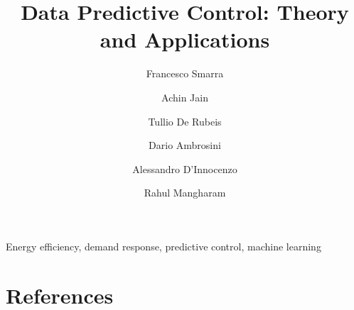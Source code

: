 \documentclass[review]{elsarticle}
\begin{document}
\begin{frontmatter}

\title{Data Predictive Control: Theory and Applications}

\author[FSaddress,EC]{Francesco Smarra}

\author[AJaddress,EC]{Achin Jain}
\author[TDRaddress,EC]{Tullio De Rubeis}
\author[TDRaddress]{Dario Ambrosini}
\author[FSaddress]{Alessandro D'Innocenzo}
\author[AJaddress]{Rahul Mangharam}


\address[FSaddress]{Department of Information Engineering, Computer Science and Mathematics, Università degli Studi dell’Aquila, L’Aquila, Italy}
\address[AJaddress]{Department of Electrical and Systems Engineering, University of Pennsylvania, Philadelphia, USA}
\address[TDRaddress]{Department of Industrial and Information Engineering and Economics, Università degli Studi dell’Aquila, L’Aquila, Italy}
\address[EC]{Equal contribution}

\begin{abstract}

\end{abstract}

\begin{keyword}
Energy efficiency, demand response, predictive control, machine learning
\end{keyword}

\end{frontmatter}
















\newpage
\section*{References}


\end{document}
